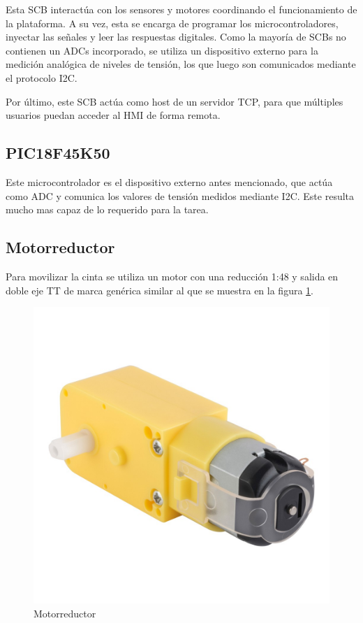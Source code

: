 \documentclass[12pt,letterpaper]{article}     %
\begin{document}
Esta SCB interactúa con los sensores y motores coordinando el funcionamiento de la plataforma.
A su vez, esta se encarga de programar los microcontroladores, inyectar las señales y leer 
las respuestas digitales. Como la mayoría de SCBs no contienen un ADCs incorporado, se utiliza
un dispositivo externo para la medición analógica de niveles de tensión, los que luego son
comunicados mediante el protocolo I2C.

Por último, este SCB actúa como host de un servidor TCP, para que múltiples usuarios puedan acceder
al HMI de forma remota.

\subsection{PIC18F45K50}

Este microcontrolador es el dispositivo externo antes mencionado, que actúa como ADC y comunica los
valores de tensión medidos mediante I2C. Este resulta mucho mas capaz de lo requerido para la tarea.

\subsection{Motorreductor}

Para movilizar la cinta se utiliza un motor con una reducción 1:48 y salida en doble eje TT de marca
genérica similar al que se muestra en la figura \ref{fig:motor}.

\begin{figure}[!ht]
\centering
\includegraphics[scale=0.25]{imagenes/motorreductor.jpg}
\caption{Motorreductor}
\label{fig:motor}
\end{figure}
\end{document}

